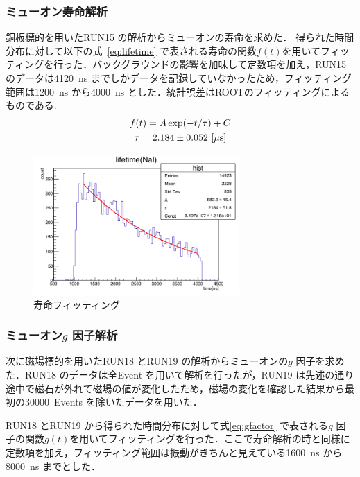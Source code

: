 \subsubsection{ミューオン寿命解析}
銅板標的を用いたRUN15 の解析からミューオンの寿命を求めた．
得られた時間分布に対して以下の式~\eqref{eq:lifetime} で表される寿命の関数$f(t)$を用いてフィッティングを行った．バックグラウンドの影響を加味して定数項を加え，RUN15 のデータは4120~ns までしかデータを記録していなかったため，フィッティング範囲は1200~ns から4000~ns とした．統計誤差はROOTのフィッティングによるものである.
\begin{gather}
f(t) = A\exp(-t / \tau)+C \label{eq:lifetime}\\
\tau = 2.184 \pm 0.052~[\mu \mathrm{s}] \notag
\end{gather}
\begin{figure}[H]
\centering
\includegraphics[width  = 0.7\textwidth]{figure/mino/lifetime_NaI_ratio.png}
\caption{寿命フィッティング}
\end{figure}


\subsubsection{ミューオン$g$ 因子解析}

次に磁場標的を用いたRUN18 とRUN19 の解析からミューオンの$g$ 因子を求めた．RUN18 のデータは全Event を用いて解析を行ったが，RUN19 は先述の通り途中で磁石が外れて磁場の値が変化したため，磁場の変化を確認した結果から最初の30000~Events を除いたデータを用いた．

RUN18 とRUN19 から得られた時間分布に対して式\eqref{eq:gfactor} で表される$g$ 因子の関数$g(t)$を用いてフィッティングを行った．ここで寿命解析の時と同様に定数項を加え，フィッティング範囲は振動がきちんと見えている1600~ns から8000~ns までとした．

